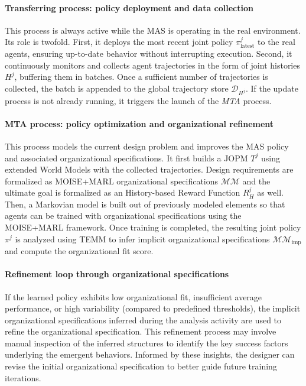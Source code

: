 \documentclass[pdflatex,sn-mathphys-num]{sn-jnl}%
\theoremstyle{thmstyleone}%
\theoremstyle{thmstyletwo}%
\theoremstyle{thmstylethree}%
\begin{document}
\paragraph{Transferring process: policy deployment and data collection}

This process is always active while the MAS is operating in the real environment. Its role is twofold. First, it deploys the most recent joint policy $\pi^j_{\text{latest}}$ to the real agents, ensuring up-to-date behavior without interrupting execution. Second, it continuously monitors and collects agent trajectories in the form of joint histories $H^j$, buffering them in batches. Once a sufficient number of trajectories is collected, the batch is appended to the global trajectory store $\mathcal{D}_{H^j}$. If the update process is not already running, it triggers the launch of the \textit{MTA} process.

\paragraph{MTA process: policy optimization and organizational refinement}

This process models the current design problem and improves the MAS policy and associated organizational specifications. It first builds a JOPM $T^j$ using extended World Models with the collected trajectories. Design requirements are formalized as MOISE+MARL organizational specifications $\mathcal{MM}$ and the ultimate goal is formalized as an History-based Reward Function $R^j_H$ as well.
%
Then, a Markovian model is built out of previously modeled elements so that agents can be trained with organizational specifications using the MOISE+MARL framework. Once training is completed, the resulting joint policy $\pi^j$ is analyzed using TEMM to infer implicit organizational specifications $\mathcal{MM}_{\text{imp}}$ and compute the organizational fit score.

\paragraph{Refinement loop through organizational specifications}

If the learned policy exhibits low organizational fit, insufficient average performance, or high variability (compared to predefined thresholds), the implicit organizational specifications inferred during the analysis activity are used to refine the organizational specification. This refinement process may involve manual inspection of the inferred structures to identify the key success factors underlying the emergent behaviors. Informed by these insights, the designer can revise the initial organizational specification to better guide future training iterations.
\end{document}

